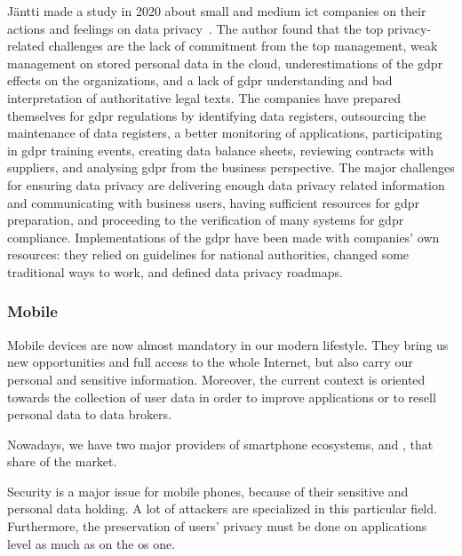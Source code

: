 Jäntti made a study in 2020 about small and medium \gls{ict} companies on their actions and feelings on data privacy~\cite{jantti_studying_2020}. The author found that the top privacy-related challenges are the lack of commitment from the top management, weak management on stored personal data in the \gls{cloud}, underestimations of the \gls{gdpr} effects on the organizations, and a lack of \gls{gdpr} understanding and bad interpretation of authoritative legal texts. The companies have prepared themselves for \gls{gdpr} regulations by identifying data registers, outsourcing the maintenance of data registers, a better monitoring of applications, participating in \gls{gdpr} training events, creating data balance sheets, reviewing contracts with suppliers, and analysing \gls{gdpr} from the business perspective. The major challenges for ensuring data privacy are delivering enough data privacy related information and communicating with business users, having sufficient resources for \gls{gdpr} preparation, and proceeding to the verification of many systems for \gls{gdpr} compliance. Implementations of the \Gls{gdpr} have been made with companies' own resources: they relied on guidelines for national authorities, changed some traditional ways to work, and defined data privacy roadmaps. %

\subsubsection{Mobile}
\label{subsubsec:state_review_results_mobile}

Mobile devices are now almost mandatory in our modern lifestyle. They bring us new opportunities and full access to the whole Internet, but also carry our personal and sensitive information. Moreover, the current context is oriented towards the collection of user data in order to improve applications or to resell personal data to data brokers.

Nowadays, we have two major providers of smartphone ecosystems,  and , that share  of the market.

Security is a major issue for mobile phones, because of their sensitive and personal data holding. A lot of attackers are specialized in this particular field. Furthermore, the preservation of users' privacy must be done on applications level as much as on the \gls{os} one.

